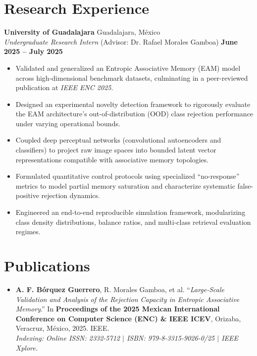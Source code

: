 \documentclass[11pt]{article}
\begin{document}
\section*{Research Experience}
\textbf{University of Guadalajara} \hfill Guadalajara, México \\
\textit{Undergraduate Research Intern} (Advisor: Dr. Rafael Morales Gamboa) \hfill \textbf{June 2025 -- July 2025}
\vspace{-0.3cm}
\begin{itemize}[leftmargin=*]
    \item Validated and generalized an Entropic Associative Memory (EAM) model across high-dimensional benchmark datasets, culminating in a peer-reviewed publication at \textit{IEEE ENC 2025}.

    \vspace{-0.3cm}
    \item Designed an experimental novelty detection framework to rigorously evaluate the EAM architecture's out-of-distribution (OOD) class rejection performance under varying operational bounds.

    \vspace{-0.3cm}
    \item Coupled deep perceptual networks (convolutional autoencoders and classifiers) to project raw image spaces into bounded latent vector representations compatible with associative memory topologies.

    \vspace{-0.3cm}
    \item Formulated quantitative control protocols using specialized ``no-response'' metrics to model partial memory saturation and characterize systematic false-positive rejection dynamics.

    \vspace{-0.3cm}
    \item Engineered an end-to-end reproducible simulation framework, modularizing class density distributions, balance ratios, and multi-class retrieval evaluation regimes.
\end{itemize}


\section*{Publications}
\begin{itemize}[leftmargin=*]
    \item \textbf{A. F. Bórquez Guerrero}, R. Morales Gamboa, et al. ``\textit{Large-Scale Validation and Analysis of the Rejection Capacity in Entropic Associative Memory}.'' In \textbf{Proceedings of the 2025 Mexican International Conference on Computer Science (ENC) \& IEEE ICEV}, Orizaba, Veracruz, México, 2025. IEEE. \\
    \footnotesize\textit{Indexing: Online ISSN: 2332-5712 $\vert$ ISBN: 979-8-3315-9026-0/25 $\vert$ IEEE Xplore.}
\end{itemize}
\end{document}
